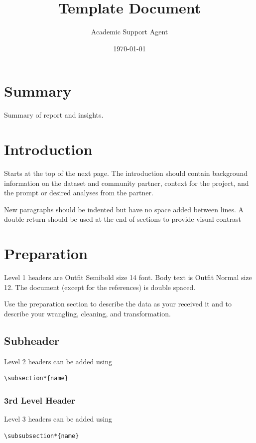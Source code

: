 \documentclass{article}
\title{Template Document}
\author{Academic Support Agent}
\date{\today}
\begin{document}
\maketitle

\setlength{\parindent}{15pt}


\vspace{1\baselineskip}
\section*{Summary}
Summary of report and insights. 


\newpage

\section*{Introduction}
Starts at the top of the next page. The introduction should contain background information on the dataset and community partner, context for the project, and the prompt or desired analyses from the partner.

New paragraphs should be indented but have no space added between lines. A double return should be used at the end of sections to provide visual contrast


\section*{Preparation}

Level 1 headers are Outfit Semibold size 14 font. Body text is Outfit Normal size 12. The document (except for the references) is double spaced.

Use the preparation section to describe the data as your received it and to describe your wrangling, cleaning, and transformation.

\subsection*{Subheader}

Level 2 headers can be added using \begin{verbatim}
\subsection*{name}
\end{verbatim}

\subsubsection*{3rd Level Header}
Level 3 headers can be added using \begin{verbatim} 
\subsubsection*{name}
\end{verbatim}
\end{document}
